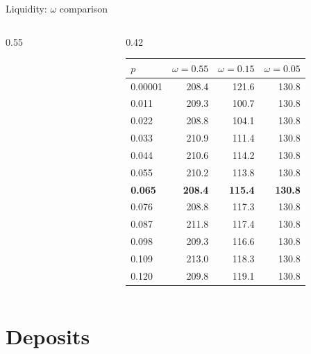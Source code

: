 \documentclass[aspectratio=169,10pt]{beamer}
\begin{document}
\begin{frame}{Liquidity: $\omega$ comparison}
\begin{columns}[T]
\begin{column}{0.55\textwidth}
\begin{figure}
      \end{figure}
    \end{column}
    \begin{column}{0.42\textwidth}
      \footnotesize\renewcommand{\arraystretch}{0.85}\setlength{\tabcolsep}{3pt}
      \begin{tabular}{lrrr}
        \toprule
        $p$ & $\omega=0.55$ & $\omega=0.15$ & $\omega=0.05$ \\
        \midrule
        0.00001 & 208.4 & 121.6 & 130.8 \\
        0.011 & 209.3 & 100.7 & 130.8 \\
        0.022 & 208.8 & 104.1 & 130.8 \\
        0.033 & 210.9 & 111.4 & 130.8 \\
        0.044 & 210.6 & 114.2 & 130.8 \\
        0.055 & 210.2 & 113.8 & 130.8 \\
        \textbf{0.065} & \textbf{208.4} & \textbf{115.4} & \textbf{130.8} \\
        0.076 & 208.8 & 117.3 & 130.8 \\
        0.087 & 211.8 & 117.4 & 130.8 \\
        0.098 & 209.3 & 116.6 & 130.8 \\
        0.109 & 213.0 & 118.3 & 130.8 \\
        0.120 & 209.8 & 119.1 & 130.8 \\
        \bottomrule
      \end{tabular}
    \end{column}
  \end{columns}
\end{frame}

\section{Deposits}
\end{document}
